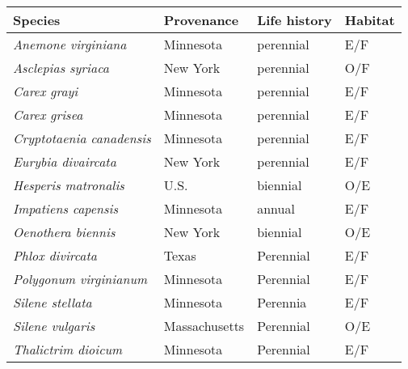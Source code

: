 \documentclass{article}\usepackage[]{graphicx}\usepackage[]{color}
\begin{document}
\begin{center}
\begin{tabular}{|l|l|l|l|}
\hline
\textbf{Species} & \textbf{Provenance} & \textbf{Life history} & \textbf{Habitat}\\
\hline
\textit{Anemone virginiana} & Minnesota & perennial & E/F\\
\hline
\textit{Asclepias syriaca} & New York & perennial & O/F \\
\hline
\textit{Carex grayi} & Minnesota & perennial & E/F\\
\hline
\textit{Carex grisea}& Minnesota & perennial & E/F\\
\hline
\textit{Cryptotaenia canadensis} & Minnesota & perennial & E/F\\
\hline
\textit{Eurybia divaircata} & New York & perennial & E/F\\
\hline
\textit{Hesperis matronalis} & U.S. & biennial & O/E\\
\hline
\textit{Impatiens capensis} & Minnesota & annual & E/F \\
\hline
\textit{Oenothera biennis} & New York & biennial & O/E \\
\hline
\textit{Phlox divircata} & Texas & Perennial & E/F\\
\hline
\textit{Polygonum virginianum} & Minnesota & Perennial & E/F\\
\hline
\textit{Silene stellata} & Minnesota & Perennia & E/F\\
\hline
\textit{Silene vulgaris} & Massachusetts & Perennial & O/E\\
\hline
\textit{Thalictrim dioicum} & Minnesota & Perennial & E/F\\
\hline
\end{tabular}

\end{center}
\end{document}

